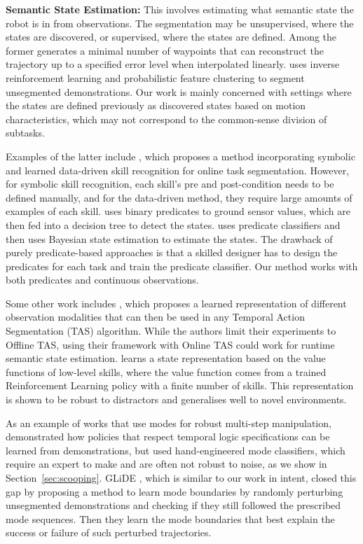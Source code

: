 \documentclass[journal]{IEEEtran}
\begin{document}
\textbf{Semantic State Estimation: } This involves estimating what semantic state the robot is in from observations. The segmentation may be unsupervised, where the states are discovered, or supervised, where the states are defined. Among the former \cite{shi2023waypointbased} generates a minimal number of waypoints that can reconstruct the trajectory up to a specified error level when interpolated linearly. \cite{hierarchical} uses inverse reinforcement learning and probabilistic feature clustering to segment unsegmented demonstrations. Our work is mainly concerned with settings where the states are defined previously as discovered states based on motion characteristics, which may not correspond to the common-sense division of subtasks. 

Examples of the latter include \cite{eiband_online_2023}, which proposes a method incorporating symbolic and learned data-driven skill recognition for online task segmentation. However, for symbolic skill recognition, each skill's pre and post-condition needs to be defined manually, and for the data-driven method, they require large amounts of examples of each skill.
\cite{hegemann_learning_2022} uses binary predicates to ground sensor values, which are then fed into a decision tree to detect the states. \cite{9811675} uses predicate classifiers and then uses Bayesian state estimation to estimate the states. The drawback of purely predicate-based approaches is that a skilled designer has to design the predicates for each task and train the predicate classifier. Our method works with both predicates and continuous observations.

Some other work includes \cite{sliwowski_m2r2_2025}, which proposes a learned representation of different observation modalities that can then be used in any Temporal Action Segmentation (TAS) \cite{TAS} algorithm. While the authors limit their experiments to Offline TAS, using their framework with Online TAS could work for runtime semantic state estimation. \cite{shah2022value} learns a state representation based on the value functions of low-level skills, where the value function comes from a trained Reinforcement Learning policy with a finite number of skills. This representation is shown to be robust to distractors and generalises well to novel environments.

As an example of works that use modes for robust multi-step manipulation, \cite{wang2022temporal} demonstrated how policies that respect temporal logic specifications can be learned from demonstrations, but used hand-engineered mode classifiers, which require an expert to make and are often not robust to noise, as we show in Section~\ref{sec:scooping}. GLiDE \cite{wang2024grounding}, which is similar to our work in intent, closed this gap by proposing a method to learn mode boundaries by randomly perturbing unsegmented demonstrations and checking if they still followed the prescribed mode sequences. Then they learn the mode boundaries that best explain the success or failure of such perturbed trajectories.
\end{document}
